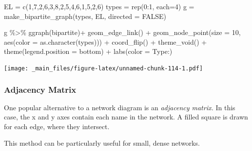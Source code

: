 \documentclass[
]{book}
\newenvironment{Shaded}{\begin{snugshade}}{\end{snugshade}}
\newcommand{\AttributeTok}[1]{\textcolor[rgb]{0.77,0.63,0.00}{#1}}
\newcommand{\ConstantTok}[1]{\textcolor[rgb]{0.00,0.00,0.00}{#1}}
\newcommand{\DecValTok}[1]{\textcolor[rgb]{0.00,0.00,0.81}{#1}}
\newcommand{\FunctionTok}[1]{\textcolor[rgb]{0.00,0.00,0.00}{#1}}
\newcommand{\NormalTok}[1]{#1}
\newcommand{\OtherTok}[1]{\textcolor[rgb]{0.56,0.35,0.01}{#1}}
\newcommand{\SpecialCharTok}[1]{\textcolor[rgb]{0.00,0.00,0.00}{#1}}
\newcommand{\StringTok}[1]{\textcolor[rgb]{0.31,0.60,0.02}{#1}}
\begin{document}
\begin{Shaded}
\begin{Highlighting}[]
\NormalTok{EL }\OtherTok{=} \FunctionTok{c}\NormalTok{(}\DecValTok{1}\NormalTok{,}\DecValTok{7}\NormalTok{,}\DecValTok{2}\NormalTok{,}\DecValTok{6}\NormalTok{,}\DecValTok{3}\NormalTok{,}\DecValTok{8}\NormalTok{,}\DecValTok{2}\NormalTok{,}\DecValTok{5}\NormalTok{,}\DecValTok{4}\NormalTok{,}\DecValTok{6}\NormalTok{,}\DecValTok{1}\NormalTok{,}\DecValTok{5}\NormalTok{,}\DecValTok{2}\NormalTok{,}\DecValTok{6}\NormalTok{)}
\NormalTok{types }\OtherTok{=} \FunctionTok{rep}\NormalTok{(}\DecValTok{0}\SpecialCharTok{:}\DecValTok{1}\NormalTok{, }\AttributeTok{each=}\DecValTok{4}\NormalTok{)}
\NormalTok{g }\OtherTok{=} \FunctionTok{make\_bipartite\_graph}\NormalTok{(types, EL, }\AttributeTok{directed =} \ConstantTok{FALSE}\NormalTok{)}

\NormalTok{g }\SpecialCharTok{\%\textgreater{}\%} \FunctionTok{ggraph}\NormalTok{(}\StringTok{\textquotesingle{}bipartite\textquotesingle{}}\NormalTok{)}\SpecialCharTok{+} 
  \FunctionTok{geom\_edge\_link}\NormalTok{() }\SpecialCharTok{+} 
  \FunctionTok{geom\_node\_point}\NormalTok{(}\AttributeTok{size =} \DecValTok{10}\NormalTok{, }\FunctionTok{aes}\NormalTok{(}\AttributeTok{color =} \FunctionTok{as.character}\NormalTok{(types)))  }\SpecialCharTok{+} \FunctionTok{coord\_flip}\NormalTok{() }\SpecialCharTok{+} \FunctionTok{theme\_void}\NormalTok{() }\SpecialCharTok{+} \FunctionTok{theme}\NormalTok{(}\AttributeTok{legend.position =} \StringTok{\textquotesingle{}bottom\textquotesingle{}}\NormalTok{) }\SpecialCharTok{+} \FunctionTok{labs}\NormalTok{(}\AttributeTok{color =} \StringTok{\textquotesingle{}Type:\textquotesingle{}}\NormalTok{)}
\end{Highlighting}
\end{Shaded}

\texttt{[image: \_main\_files/figure-latex/unnamed-chunk-114-1.pdf]}

\hypertarget{adjacency-matrix}{%
\subsubsection{Adjacency Matrix}\label{adjacency-matrix}}

One popular alternative to a network diagram is an \emph{adjacency matrix.} In this case, the x and y axes contain each name in the network. A filled square is drawn for each edge, where they intersect.

This method can be particularly useful for small, dense networks.
\end{document}
